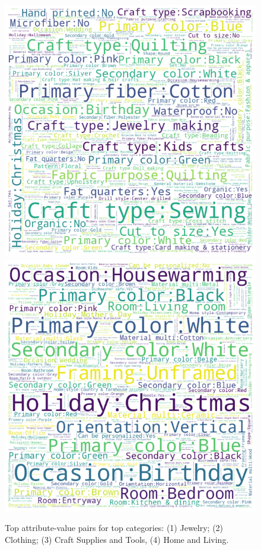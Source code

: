 \documentclass[11pt, dvipdfmx]{article}
\begin{document}
\begin{figure}
    \includegraphics[bb=0 0 110 100]{figs/craft_supplies_and_tools.png}
    \includegraphics[bb=110 0 220 100]{figs/home_and_living.png}
\caption[Word clouds of item attributes in each dataset]{Top attribute-value pairs for top categories: (1) Jewelry; (2) Clothing; (3) Craft Supplies and Tools, (4) Home and Living.}
\label{fig:wordCloud}
\end{figure}
\end{document}

